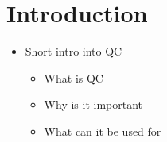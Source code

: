 \chapter{Introduction}
\begin{itemize}
    \item Short intro into QC
    \begin{itemize}
        \item What is QC
        \item Why is it important
        \item What can it be used for
    \end{itemize}
\end{itemize}